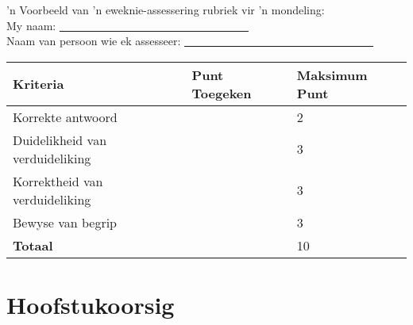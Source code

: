 'n Voorbeeld van 'n eweknie-assessering rubriek vir 'n mondeling:\\
My naam: \underline{~~~~~~~~~~~~~~~~~~~~~~~~~~~~~~~~~~}\\
Naam van persoon wie ek assesseer: \underline{~~~~~~~~~~~~~~~~~~~~~~~~~~~~~~~~~~}\\

\begin{table}[H]
 \begin{center}
  \begin{tabular}{|p{5cm}|p{2.5cm}|p{2.5cm}|} \hline
  \textbf{Kriteria} & \textbf{Punt Toegeken} & \textbf{Maksimum Punt}\\ \hline
Korrekte antwoord &&2\\ \hline
Duidelikheid van verduideliking&&3\\ \hline
Korrektheid van verduideliking  &&3\\ \hline
Bewyse van begrip &&3\\ \hline
\textbf{Totaal} &&10\\ \hline

  \end{tabular}

 \end{center}

\end{table}

\section{Hoofstukoorsig}
